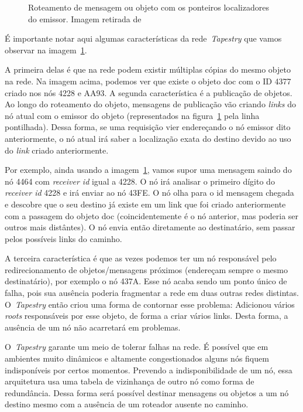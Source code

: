 \begin{figure}
	\centering
	\caption{Roteamento de mensagem ou objeto com os ponteiros localizadores do emissor. Imagem retirada de~\cite{welzi11}}
	\label{fig:roteamento-obj}
\end{figure}

É importante notar aqui algumas características da rede~\emph{Tapestry} que vamos observar na imagem~\ref{fig:roteamento-obj}.

A primeira delas é que na rede podem existir múltiplas cópias do mesmo objeto na rede. Na imagem acima, podemos ver que existe o objeto doc com o ID 4377 criado nos nós 4228 e AA93. A segunda característica é a publicação de objetos. Ao longo do roteamento do objeto, mensagens de publicação vão criando \emph{links} do nó atual com o emissor do objeto (representados na figura~\ref{fig:roteamento-obj} pela linha pontilhada). Dessa forma, se uma requisição vier endereçando o nó emissor dito anteriormente, o nó atual irá saber a localização exata do destino devido ao uso do \emph{link} criado anteriormente.

Por exemplo, ainda usando a imagem~\ref{fig:roteamento-obj}, vamos supor uma mensagem saindo do nó 4464 com \emph{receiver id} igual a 4228. O nó irá analisar o primeiro dígito do \emph{receiver id} 4228 e irá enviar ao nó 43FE. O nó olha para o id mensagem chegada e descobre que o seu destino já existe em um link que foi criado anteriormente com a passagem do objeto doc (coincidentemente é o nó anterior, mas poderia ser outros mais distântes). O nó envia então diretamente ao destinatário, sem passar pelos possíveis links do caminho.

A terceira característica é que as vezes podemos ter um nó responsável pelo redirecionamento de objetos/mensagens próximos (endereçam sempre o mesmo destinatário), por exemplo o nó 437A. Esse nó acaba sendo um ponto único de falha, pois sua ausência poderia fragmentar a rede em duas outras redes distintas. O~\emph{Tapestry} então criou uma forma de contornar esse problema: Adicionou vários \emph{roots} responsáveis por esse objeto, de forma a criar vários links. Desta forma, a ausência de um nó não acarretará em problemas.

O~\emph{Tapestry} garante um meio de tolerar falhas na rede. É possível que em ambientes muito dinâmicos e altamente congestionados alguns nós fiquem indisponíveis por certos momentos. Prevendo a indisponibilidade de um nó, essa arquitetura usa uma tabela de vizinhança de outro nó como forma de redundância. Dessa forma será possível destinar mensagens ou objetos a um nó destino mesmo com a ausência de um roteador ausente no caminho.

